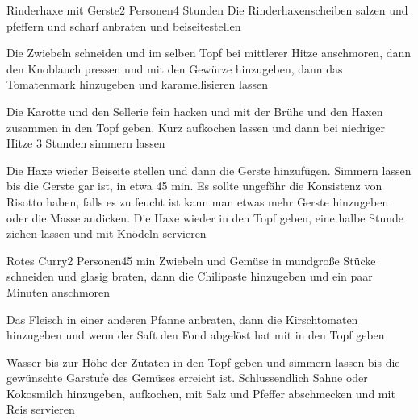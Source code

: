 \begin{recipe}{Rinderhaxe mit Gerste}{2 Personen}{4 Stunden}
Die Rinderhaxenscheiben salzen und pfeffern und scharf anbraten und beiseitestellen

Die Zwiebeln schneiden und im selben Topf bei mittlerer Hitze anschmoren, dann den Knoblauch pressen und  mit den Gewürze hinzugeben, dann das Tomatenmark hinzugeben und karamellisieren lassen

Die Karotte und den Sellerie fein hacken und mit der Brühe und den Haxen zusammen in den Topf geben. Kurz aufkochen lassen und dann bei niedriger Hitze 3 Stunden simmern lassen

Die Haxe wieder Beiseite stellen und dann die Gerste hinzufügen.
Simmern lassen bis die Gerste gar ist, in etwa 45 min. Es sollte ungefähr die Konsistenz von Risotto haben, falls es zu feucht ist kann man etwas mehr Gerste hinzugeben oder die Masse andicken.
Die Haxe wieder in den Topf geben, eine halbe Stunde ziehen lassen und mit Knödeln servieren
\end{recipe}


\begin{recipe}{Rotes Curry}{2 Personen}{45 min}
Zwiebeln und Gemüse in mundgroße Stücke schneiden und glasig braten, dann die Chilipaste hinzugeben und ein paar Minuten anschmoren

Das Fleisch in einer anderen Pfanne anbraten, dann die Kirschtomaten hinzugeben und wenn der Saft den Fond abgelöst hat mit in den Topf geben

Wasser bis zur Höhe der Zutaten in den Topf geben und simmern lassen bis die gewünschte Garstufe des Gemüses erreicht ist. Schlussendlich Sahne oder Kokosmilch hinzugeben, aufkochen, mit Salz und Pfeffer abschmecken und mit Reis servieren
\end{recipe}

